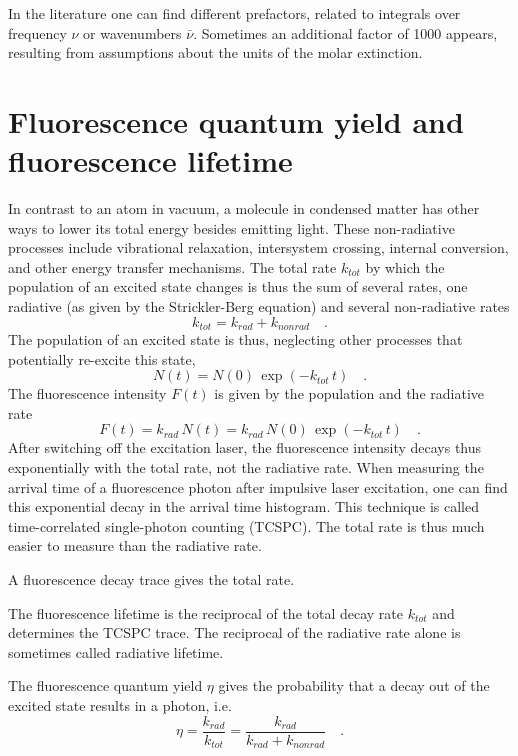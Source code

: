 In the literature one can find different prefactors, related to integrals over frequency $\nu$ or wavenumbers $\bar{\nu}$. Sometimes an additional factor of 1000 appears, resulting from assumptions about the units of the molar extinction.




\section{Fluorescence quantum yield and fluorescence lifetime} 

In contrast to an atom in vacuum, a molecule in condensed matter has other ways to lower its total energy besides emitting light. These non-radiative processes include vibrational relaxation, intersystem crossing, internal conversion, and other energy transfer mechanisms. The total rate $k_{tot}$ by which the population of an excited state changes is thus the sum of several rates, one radiative (as given by the Strickler-Berg equation) and several non-radiative rates
\begin{equation}
 k_{tot} = k_{rad} + k_{non rad}  \quad .
\end{equation}
%
The population of an excited state is thus, neglecting other processes that  potentially re-excite this state,
\begin{equation}
 N(t) = N(0) \, \exp \left( - k_{tot}  \,t \right) \quad .
\end{equation}
The fluorescence intensity $F(t)$ is given by the population and the radiative rate
\begin{equation}
 F(t) = k_{rad} \, N(t) = k_{rad} \,  N(0) \, \exp \left( - k_{tot} \, t \right) \quad .
\end{equation}
After switching off the excitation laser, the fluorescence intensity decays thus exponentially with the total rate, not the radiative rate. When measuring the arrival time of a fluorescence photon after impulsive laser excitation, one can find this exponential decay in the arrival time histogram. This technique is called time-correlated single-photon counting (TCSPC). The total rate is thus much easier to measure than the radiative rate. 


\begin{marginfigure}
  \caption{A fluorescence decay trace gives the total rate.}
\end{marginfigure}


The fluorescence lifetime is the reciprocal of the total decay rate $k_{tot}$ and determines the TCSPC trace. The reciprocal of the radiative rate alone is sometimes called radiative lifetime.

The fluorescence quantum yield $\eta$ gives the probability that a decay out of the excited state results in a photon, i.e.
\begin{equation}
 \eta   = \frac{k_{rad}}{k_{tot}} = \frac{k_{rad}}{k_{rad} + k_{non rad}} \quad .
\end{equation}





\printbibliography[segment=\therefsegment,heading=subbibliography]
